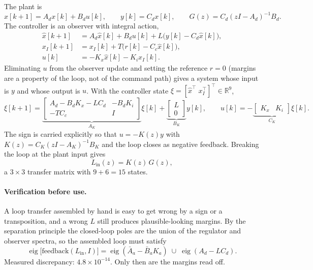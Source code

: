 The plant is
\begin{equation}
  x[k+1]=A_dx[k]+B_du[k],\qquad y[k]=C_dx[k],
  \qquad G(z)=C_d(zI-A_d)^{-1}B_d .
\end{equation}
The controller is an observer with integral action,
\begin{align}
  \hat{x}[k+1] &= A_d\hat{x}[k]+B_du[k]+L\bigl(y[k]-C_d\hat{x}[k]\bigr),\\
  x_I[k+1]     &= x_I[k]+T\bigl(r[k]-C_c\hat{x}[k]\bigr),\\
  u[k]         &= -K_x\hat{x}[k]-K_ix_I[k].
\end{align}
Eliminating $u$ from the observer update and setting the reference $r=0$ (margins
are a property of the loop, not of the command path) gives a system whose input
is $y$ and whose output is $u$. With the controller state
$\xi=[\hat{x}^\top\;x_I^\top]^\top\in\mathbb{R}^{9}$,
\begin{equation}
  \xi[k+1]=
  \underbrace{\begin{bmatrix} A_d-B_dK_x-LC_d & -B_dK_i\\[2pt] -TC_c & I\end{bmatrix}}_{A_K}\xi[k]
  +\underbrace{\begin{bmatrix}L\\0\end{bmatrix}}_{B_K}y[k],
  \qquad
  u[k]=-\underbrace{\begin{bmatrix}K_x & K_i\end{bmatrix}}_{C_K}\xi[k].
  \label{eq:controller}
\end{equation}
The sign is carried explicitly so that $u=-K(z)y$ with
$K(z)=C_K(zI-A_K)^{-1}B_K$ and the loop closes as negative feedback. Breaking the
loop at the plant input gives
\begin{equation}
  L_{\mathrm{in}}(z)=K(z)\,G(z),
  \label{eq:loop}
\end{equation}
a $3\times3$ transfer matrix with $9+6=15$ states.

\paragraph{Verification before use.} A loop transfer assembled by hand is easy to
get wrong by a sign or a transposition, and a wrong $L$ still produces
plausible-looking margins. By the separation principle the closed-loop poles are
the union of the regulator and observer spectra, so the assembled loop must satisfy
\begin{equation}
  \operatorname{eig}\bigl[\text{feedback}(L_{\mathrm{in}},I)\bigr]
  =\operatorname{eig}(\bar{A}_a-\bar{B}_aK_a)\;\cup\;\operatorname{eig}(A_d-LC_d).
\end{equation}
Measured discrepancy: $4.8\times10^{-14}$. Only then are the margins read off.

